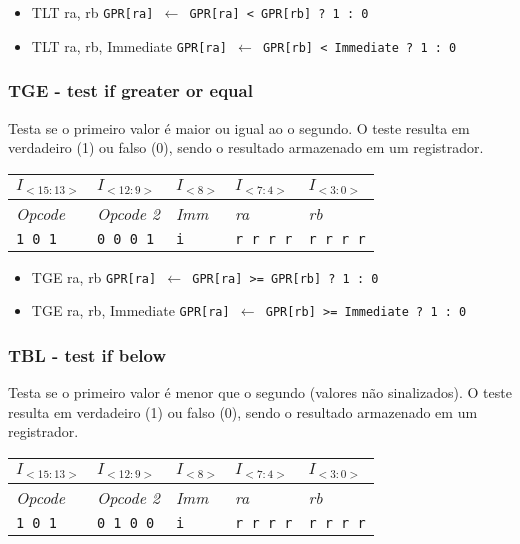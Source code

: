 \documentclass[11pt,a4paper]{report}
\begin{document}
\begin{itemize}
\item TLT ra, rb
\subitem \texttt{GPR[ra] $\leftarrow$ GPR[ra] < GPR[rb] ? 1 : 0}
\item TLT ra, rb, Immediate
\subitem \texttt{GPR[ra] $\leftarrow$ GPR[rb] < Immediate ? 1 : 0}
\end{itemize}

\subsubsection{TGE - test if greater or equal}
Testa se o primeiro valor é maior ou igual ao o segundo. O teste resulta
em verdadeiro (1) ou falso (0), sendo o resultado armazenado em um
registrador.

\begin{table}[htb!]
\centering
\begin{tabular}{|p{2cm}|p{2cm}|p{2cm}|p{2cm}|p{2cm}|}
\hline
$I_{<15:13>}$ & $I_{<12:9>}$ & $I_{<8>}$ & $I_{<7:4>}$ & $I_{<3:0>}$  \\ \hline
\textit{Opcode} & \textit{Opcode 2} & \textit{Imm} & \textit{ra} & \textit{rb} \\ \hline
\texttt{1 0 1} & \texttt{0 0 0 1} & \texttt{i} & \texttt{r r r r} & \texttt{r r r r} \\ \hline
\end{tabular}
\end{table}

\begin{itemize}
\item TGE ra, rb
\subitem \texttt{GPR[ra] $\leftarrow$ GPR[ra] >= GPR[rb] ? 1 : 0}
\item TGE ra, rb, Immediate
\subitem \texttt{GPR[ra] $\leftarrow$ GPR[rb] >= Immediate ? 1 : 0}
\end{itemize}

\subsubsection{TBL - test if below}
Testa se o primeiro valor é menor que o segundo (valores não sinalizados).
O teste resulta em verdadeiro (1) ou falso (0), sendo o resultado
armazenado em um registrador.

\begin{table}[htb!]
\centering
\begin{tabular}{|p{2cm}|p{2cm}|p{2cm}|p{2cm}|p{2cm}|}
\hline
$I_{<15:13>}$ & $I_{<12:9>}$ & $I_{<8>}$ & $I_{<7:4>}$ & $I_{<3:0>}$  \\ \hline
\textit{Opcode} & \textit{Opcode 2} & \textit{Imm} & \textit{ra} & \textit{rb} \\ \hline
\texttt{1 0 1} & \texttt{0 1 0 0} & \texttt{i} & \texttt{r r r r} & \texttt{r r r r} \\ \hline
\end{tabular}
\end{table}
\end{document}
